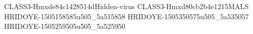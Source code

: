CLASS3-Hmxde84c1428514dHidden-virus
CLASS3-Hmxd80cb2b4e1215MALS
HRIDOYE-1505158585u505_5a515858
HRIDOYE-1505350575u505_5a535057
HRIDOYE-1505259505u505_5a525950
